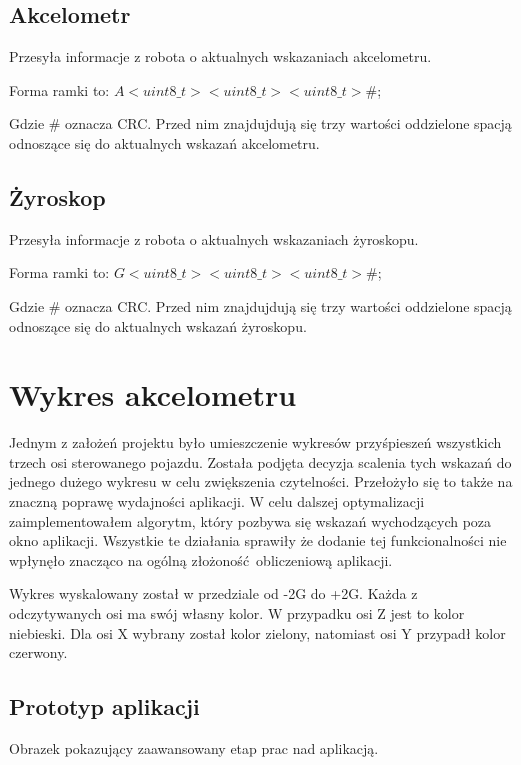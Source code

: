 \documentclass[12pt,a4paper,polish]{article}
\begin{document}
  \subsection{Akcelometr}
  Przesyła informacje z robota o aktualnych wskazaniach akcelometru.

  Forma ramki to: $A<uint8\_t> <uint8\_t> <uint8\_t>\#$;
  \newline

  Gdzie \# oznacza CRC. Przed nim znajdujdują się trzy wartości oddzielone spacją
  odnoszące się do aktualnych wskazań akcelometru.


  \subsection{Żyroskop}
  Przesyła informacje z robota o aktualnych wskazaniach żyroskopu.

  Forma ramki to: $G<uint8\_t> <uint8\_t> <uint8\_t>\#$;
  \newline

  Gdzie \# oznacza CRC. Przed nim znajdujdują się trzy wartości oddzielone spacją
  odnoszące się do aktualnych wskazań żyroskopu.

  \section{Wykres akcelometru}
  Jednym z założeń projektu było umieszczenie wykresów przyśpieszeń wszystkich
  trzech osi sterowanego pojazdu. Została podjęta decyzja scalenia tych wskazań
  do jednego dużego wykresu w celu zwiększenia czytelności. Przełożyło się to także
  na znaczną poprawę wydajności aplikacji. W celu dalszej optymalizacji 
  zaimplementowałem algorytm, który pozbywa się wskazań wychodzących poza okno 
  aplikacji. Wszystkie te działania sprawiły że dodanie tej funkcionalności
  nie wpłynęło znacząco na ogólną złożoność obliczeniową aplikacji.
  
  Wykres wyskalowany został w przedziale od -2G do +2G. Każda z odczytywanych osi
  ma swój własny kolor. W przypadku osi Z jest to kolor niebieski. 
  Dla osi X wybrany został kolor zielony, natomiast osi Y przypadł kolor czerwony.

  \subsection{Prototyp aplikacji}
  Obrazek pokazujący zaawansowany etap prac nad aplikacją.
\end{document}
